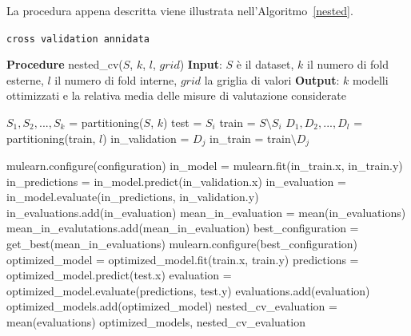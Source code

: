 \documentclass[12pt]{report}
\theoremstyle{definition}
\begin{document}
La procedura appena descritta viene illustrata nell'Algoritmo~\ref{nested}.
\begin{algorithm}
\caption{\texttt{cross validation annidata}}
\label{nested}
\hspace*{\algorithmicindent} \textbf{Procedure} nested\_cv($S$, $k$, $l$, $grid$)
\newline
\hspace*{\algorithmicindent} \textbf{Input}: $S$ è il dataset, $k$ il numero di fold esterne, $l$ il numero di fold interne, $grid$ la griglia di valori
\newline
\hspace*{\algorithmicindent} \textbf{Output}: $k$ modelli ottimizzati e la relativa media delle misure di valutazione considerate
\begin{algorithmic}[1]
\STATE $S_1, S_2, ..., S_k$ = partitioning($S$, $k$)
\STATE test = $S_i$
\STATE train = $S \setminus S_i$
\STATE $D_1, D_2, ..., D_l$ = partitioning(train, $l$)
\STATE in\_validation = $D_j$
\STATE in\_train = train$\setminus D_j$

\STATE mulearn.configure(configuration)
\STATE in\_model = mulearn.fit(in\_train.x, in\_train.y)
\STATE in\_predictions = in\_model.predict(in\_validation.x)
\STATE in\_evaluation = in\_model.evaluate(in\_predictions, in\_validation.y)
\STATE in\_evaluations.add(in\_evaluation)
\STATE mean\_in\_evaluation = mean(in\_evaluations)
\ENDFOR
\STATE mean\_in\_evalutations.add(mean\_in\_evaluation)
\ENDFOR
\STATE best\_configuration = get\_best(mean\_in\_evaluations)
\STATE mulearn.configure(best\_configuration)
\STATE optimized\_model = optimized\_model.fit(train.x, train.y)
\STATE predictions = optimized\_model.predict(test.x)
\STATE evaluation = optimized\_model.evaluate(predictions, test.y)
\STATE evaluations.add(evaluation)
\STATE optimized\_models.add(optimized\_model)
\ENDFOR
\STATE nested\_cv\_evaluation = mean(evaluations)
\RETURN optimized\_models, nested\_cv\_evaluation
\end{algorithmic}
\end{algorithm}
\end{document}
